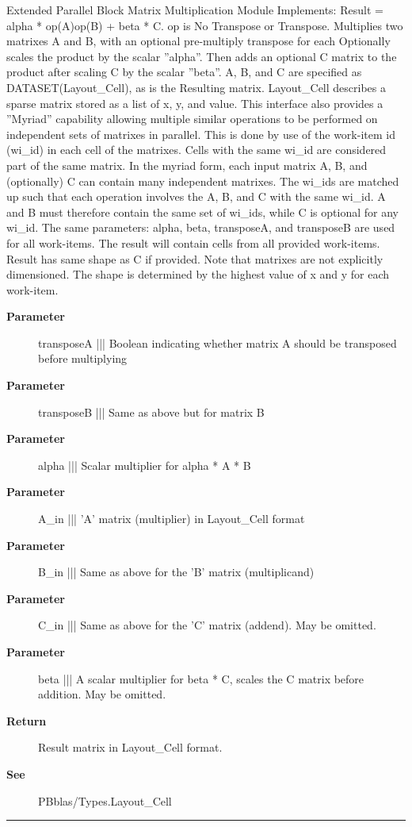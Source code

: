 \par
Extended Parallel Block Matrix Multiplication Module Implements: Result = alpha * op(A)op(B) + beta * C. op is No Transpose or Transpose. Multiplies two matrixes A and B, with an optional pre-multiply transpose for each Optionally scales the product by the scalar ''alpha''. Then adds an optional C matrix to the product after scaling C by the scalar ''beta''. A, B, and C are specified as DATASET(Layout\_Cell), as is the Resulting matrix. Layout\_Cell describes a sparse matrix stored as a list of x, y, and value. This interface also provides a ''Myriad'' capability allowing multiple similar operations to be performed on independent sets of matrixes in parallel. This is done by use of the work-item id (wi\_id) in each cell of the matrixes. Cells with the same wi\_id are considered part of the same matrix. In the myriad form, each input matrix A, B, and (optionally) C can contain many independent matrixes. The wi\_ids are matched up such that each operation involves the A, B, and C with the same wi\_id. A and B must therefore contain the same set of wi\_ids, while C is optional for any wi\_id. The same parameters: alpha, beta, transposeA, and transposeB are used for all work-items. The result will contain cells from all provided work-items. Result has same shape as C if provided. Note that matrixes are not explicitly dimensioned. The shape is determined by the highest value of x and y for each work-item.

\par
\begin{description}
\item [\textbf{Parameter}] transposeA ||| Boolean indicating whether matrix A should be transposed before multiplying
\item [\textbf{Parameter}] transposeB ||| Same as above but for matrix B
\item [\textbf{Parameter}] alpha ||| Scalar multiplier for alpha * A * B
\item [\textbf{Parameter}] A\_in ||| 'A' matrix (multiplier) in Layout\_Cell format
\item [\textbf{Parameter}] B\_in ||| Same as above for the 'B' matrix (multiplicand)
\item [\textbf{Parameter}] C\_in ||| Same as above for the 'C' matrix (addend). May be omitted.
\item [\textbf{Parameter}] beta ||| A scalar multiplier for beta * C, scales the C matrix before addition. May be omitted.
\item [\textbf{Return}] Result matrix in Layout\_Cell format.
\item [\textbf{See}] PBblas/Types.Layout\_Cell
\end{description}

\rule{\linewidth}{0.5pt}
